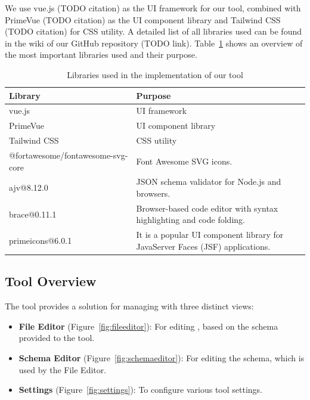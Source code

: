 We use vue.js (TODO citation) as the UI framework for our tool, combined with PrimeVue (TODO citation) as the UI component library and Tailwind CSS (TODO citation) for CSS utility.
A detailed list of all libraries used can be found in the wiki of our GitHub repository (TODO link).
Table~\ref{tab:libraries} shows an overview of the most important libraries used and their purpose.

\begin{table}[!hb] %
    \caption{Libraries used in the implementation of our tool}
    \label{tab:libraries}
    \centering
    \begin{tabular}{ll}
        \toprule
        \textbf{Library} & \textbf{Purpose}     \\
        \midrule
        vue.js           & UI framework         \\
        PrimeVue         & UI component library \\
        Tailwind CSS     & CSS utility          \\
        @fortawesome/fontawesome-svg-core & Font Awesome SVG icons. \\
        ajv@8.12.0 & JSON schema validator for Node.js and browsers. \\
        brace@0.11.1 & Browser-based code editor with syntax highlighting and code folding. \\
        primeicons@6.0.1 & It is a popular UI component library for JavaServer Faces (JSF) applications. \\
        \bottomrule
    \end{tabular}
\end{table}

\subsection{Tool Overview}\label{subsec:tool-overview} %


The tool provides a solution for managing \cfgfiles{} with three distinct views:
\begin{itemize}
    \item \textbf{File Editor} (Figure~\ref{fig:fileeditor}): For editing \cfgfiles{}, based on the schema provided to the tool.
    \item \textbf{Schema Editor} (Figure~\ref{fig:schemaeditor}): For editing the schema, which is used by the File Editor.
    \item \textbf{Settings} (Figure~\ref{fig:settings}): To configure various tool settings.
\end{itemize}

